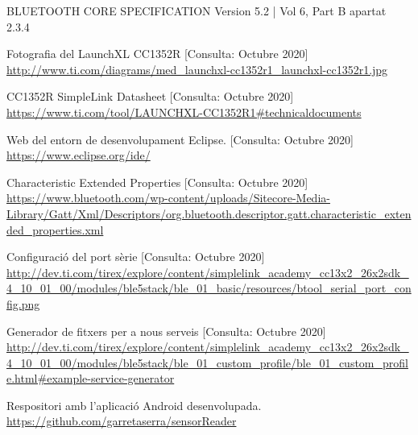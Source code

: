 \begin{thebibliography}{2}
BLUETOOTH CORE SPECIFICATION Version 5.2 | Vol 6, Part B apartat 2.3.4

Fotografia del LaunchXL CC1352R
[Consulta: Octubre 2020]\newline
\href{http://www.ti.com/diagrams/med_launchxl-cc1352r1_launchxl-cc1352r1.jpg}{http://www.ti.com/diagrams/med\_launchxl-cc1352r1\_launchxl-cc1352r1.jpg}

CC1352R SimpleLink Datasheet
[Consulta: Octubre 2020]\newline
\href{https://www.ti.com/tool/LAUNCHXL-CC1352R1\#technicaldocuments}{https://www.ti.com/tool/LAUNCHXL-CC1352R1\#technicaldocuments}

Web del entorn de desenvolupament Eclipse.
[Consulta: Octubre 2020] \newline
\href{https://www.eclipse.org/ide/}{https://www.eclipse.org/ide/}

Characteristic Extended Properties
[Consulta: Octubre 2020]\newline
\href{https://www.bluetooth.com/wp-content/uploads/Sitecore-Media-Library/Gatt/Xml/Descriptors/org.bluetooth.descriptor.gatt.characteristic_extended_properties.xml}{https://www.bluetooth.com/wp-content/uploads/Sitecore-Media-Library/Gatt/Xml/Descriptors/org.bluetooth.descriptor.gatt.characteristic\_extended\_properties.xml}

Configuració del port sèrie
[Consulta: Octubre 2020] \newline
\href{http://dev.ti.com/tirex/explore/content/simplelink_academy_cc13x2_26x2sdk_4_10_01_00/modules/ble5stack/ble_01\_basic/resources/btool_serial_port_config.png}{http://dev.ti.com/tirex/explore/content/simplelink\_academy\_cc13x2\_26x2sdk\_4\_10\_01\_00/modules/ble5stack/ble\_01\_basic/resources/btool\_serial\_port\_config.png}

Generador de fitxers per a nous serveis 
[Consulta: Octubre 2020] \newline
\href{http://dev.ti.com/tirex/explore/content/simplelink\_academy\_cc13x2\_26x2sdk\_4\_10\_01\_00/modules/ble5stack/ble\_01\_custom\_profile/ble\_01\_custom\_profile.html\#example-service-generator}{http://dev.ti.com/tirex/explore/content/simplelink\_academy\_cc13x2\_26x2sdk\_4\_10\_01\_00/modules/ble5stack/ble\_01\_custom\_profile/ble\_01\_custom\_profile.html\#example-service-generator}

Respositori amb l'aplicació Android desenvolupada. \newline
\href{https://github.com/garretaserra/sensorReader}{https://github.com/garretaserra/sensorReader}


\end{thebibliography}
